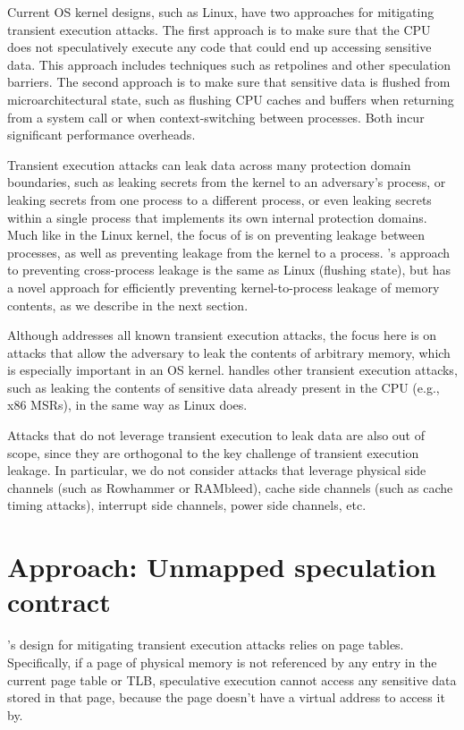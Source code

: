 Current OS kernel designs, such as Linux, have two approaches for
mitigating transient execution attacks.  The first approach is to make
sure that the CPU does not speculatively execute any code that could
end up accessing sensitive data.  This approach includes techniques such
as retpolines and other speculation barriers.  The second approach is to
make sure that sensitive data is flushed from microarchitectural state,
such as flushing CPU caches and buffers when returning from a system
call or when context-switching between processes.  Both incur significant
performance overheads.

Transient execution attacks can leak data across many protection domain
boundaries, such as leaking secrets from the kernel to an adversary's
process, or leaking secrets from one process to a different process,
or even leaking secrets within a single process that implements its
own internal protection domains.  Much like in the Linux kernel, the
focus of \sys is on preventing leakage between processes, as well as
preventing leakage from the kernel to a process.  \sys's approach to
preventing cross-process leakage is the same as Linux (flushing state),
but \sys has a novel approach for efficiently preventing kernel-to-process
leakage of memory contents, as we describe in the next section.

Although \sys addresses all known transient execution attacks, the focus
here is on attacks that allow the adversary to leak the contents
of arbitrary memory, which is especially important in an OS kernel.
\sys handles other transient execution attacks, such as leaking the
contents of sensitive data already present in the CPU (e.g., x86 MSRs),
in the same way as Linux does.

Attacks that do not leverage transient execution to leak data are also
out of scope, since they are orthogonal to the key
challenge of transient execution leakage.  In particular, we do not
consider attacks that leverage physical side channels (such
as Rowhammer or RAMbleed), cache side channels (such as cache timing
attacks), interrupt side channels, power side channels, etc.

\section{Approach: Unmapped speculation contract}

\sys's design for mitigating transient execution attacks relies
on page tables.  Specifically, if a page of physical
memory is not referenced by any entry in the current page table or
TLB, speculative execution cannot access any sensitive data stored in
that page, because the page doesn't have a virtual address to access
it by.

